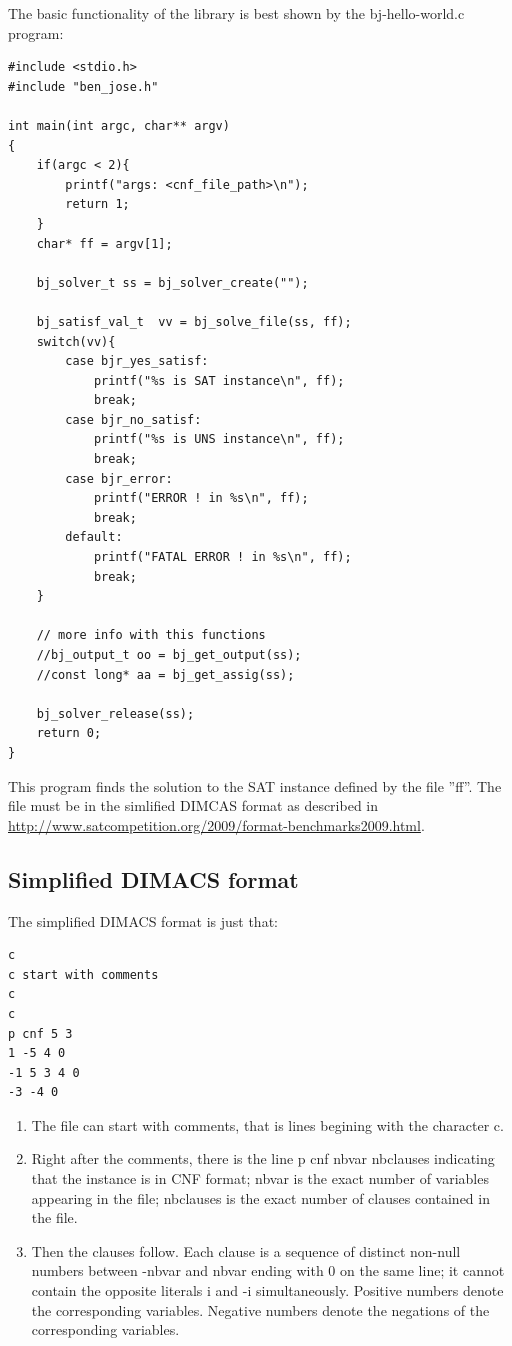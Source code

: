 \documentclass{easychair}
\begin{document}
The basic functionality of the library is best shown by the bj-hello-world.c program:

\begin{lstlisting}[label=hello-prog, caption=bj-hello-world.c program,]
#include <stdio.h>
#include "ben_jose.h"

int main(int argc, char** argv)
{
	if(argc < 2){
		printf("args: <cnf_file_path>\n");
		return 1;
	}
	char* ff = argv[1];
	
	bj_solver_t ss = bj_solver_create("");
	
	bj_satisf_val_t  vv = bj_solve_file(ss, ff);
	switch(vv){
		case bjr_yes_satisf:
			printf("%s is SAT instance\n", ff);
			break;
		case bjr_no_satisf:
			printf("%s is UNS instance\n", ff);
			break;
		case bjr_error:
			printf("ERROR ! in %s\n", ff);
			break;
		default:
			printf("FATAL ERROR ! in %s\n", ff);
			break;
	}
	
	// more info with this functions
	//bj_output_t oo = bj_get_output(ss);
	//const long* aa = bj_get_assig(ss);
	
	bj_solver_release(ss);
	return 0;
}
\end{lstlisting}

This program finds the solution to the SAT instance defined by the file ''ff''. The file must be in the simlified DIMCAS format as described in \url{http://www.satcompetition.org/2009/format-benchmarks2009.html}.


\subsection{Simplified DIMACS format}
\label{sect:dimacs}

The simplified DIMACS format is just that:

\begin{lstlisting}[label=dimacs-format, caption=Simplified DIMACS CNF format example,]
c
c start with comments
c
c 
p cnf 5 3
1 -5 4 0
-1 5 3 4 0
-3 -4 0
\end{lstlisting}

\begin{enumerate}
\item
The file can start with comments, that is lines begining with the character c.

\item
Right after the comments, there is the line p cnf nbvar nbclauses indicating that the instance is in CNF format; nbvar is the exact number of variables appearing in the file; nbclauses is the exact number of clauses contained in the file.

\item
Then the clauses follow. Each clause is a sequence of distinct non-null numbers between -nbvar and nbvar ending with 0 on the same line; it cannot contain the opposite literals i and -i simultaneously. Positive numbers denote the corresponding variables. Negative numbers denote the negations of the corresponding variables.
\end{enumerate}
\end{document}
